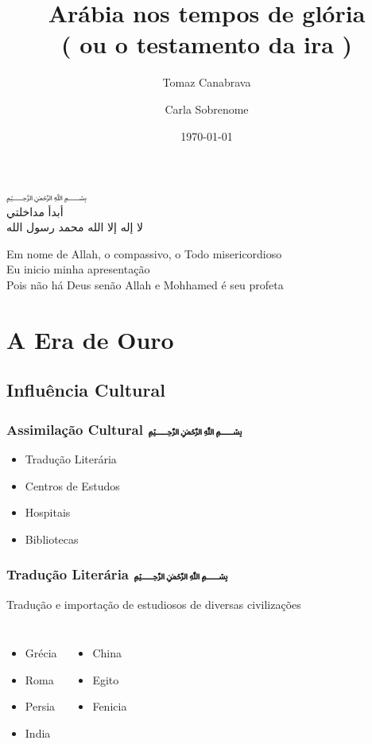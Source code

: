 \documentclass{beamer}
\title{ Arábia nos tempos de glória \\( ou o testamento da ira )}
\author{ Tomaz {Canabrava} \and Carla {Sobrenome}}
\institute{ IFSP - HTO \\ Instituto federal de São Paulo, Campus Hortolândia}
\date{\today}
\begin{document}
\begin{frame}
	\begin{center}
		\textarabic{﷽\\أبدأ مداخلتي\\ لا إله إلا الله محمد رسول الله}
	\end{center}
\end{frame}

\begin{frame}
	\begin{center}
		Em nome de Allah, o compassivo, o Todo misericordioso\\
		Eu inicio minha apresentação\\
		Pois não há Deus senão Allah e Mohhamed é seu profeta
	\end{center}
\end{frame}

\begin{frame}
 \titlepage
\end{frame}

\section{A Era de Ouro}
\subsection{Influência Cultural}

\begin{frame} \frametitle{ Assimilação Cultural \hfill \textarabic{﷽}}
	\begin{itemize}
		\item Tradução Literária \pause
		\item Centros de Estudos \pause
		\item Hospitais          \pause
		\item Bibliotecas
		\end{itemize}
\end{frame}

\begin{frame} \frametitle{ Tradução Literária \hfill \textarabic{﷽}}
	Tradução e importação de estudiosos de diversas civilizações
	\begin{columns}
		\begin{itemize}
			\item Grécia
			\item Roma
			\item Persia
			\item India
		\end{itemize}
		\begin{itemize}
			\item China
			\item Egito
			\item Fenicia
		\end{itemize}
	\end{columns}
\end{frame}
\end{document}
